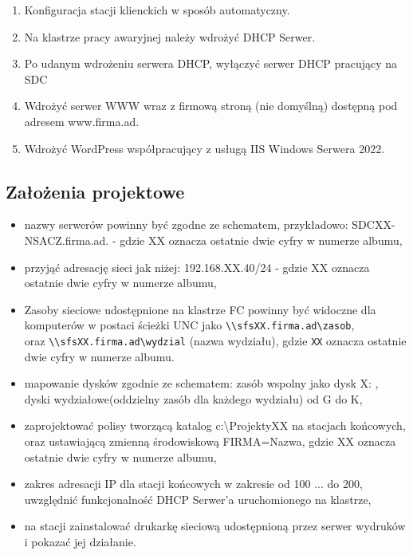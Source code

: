 \begin{enumerate}
          \newpage
    \item Konfiguracja stacji klienckich w sposób automatyczny.
    \item Na klastrze pracy awaryjnej należy wdrożyć DHCP Serwer.
    \item Po udanym wdrożeniu serwera DHCP, wyłączyć serwer DHCP pracujący na SDC
    \item Wdrożyć serwer WWW wraz z firmową stroną (nie domyślną) dostępną pod adresem
          www.firma.ad.
    \item Wdrożyć WordPress współpracujący z usługą IIS Windows Serwera 2022.
\end{enumerate}
\subsection{Założenia projektowe}
\begin{itemize}
    \item nazwy serwerów powinny być zgodne ze schematem, przykładowo: SDCXX-NSACZ.firma.ad. - gdzie
          XX oznacza ostatnie dwie cyfry w numerze albumu,
    \item przyjąć adresację sieci jak niżej: 192.168.XX.40/24 - gdzie XX oznacza ostatnie dwie cyfry w numerze albumu,
    \item Zasoby sieciowe udostępnione na klastrze FC powinny być widoczne dla komputerów w postaci ścieżki UNC jako \texttt{\textbackslash\textbackslash sfsXX.firma.ad\textbackslash zasob}, \\ oraz \texttt{\textbackslash\textbackslash sfsXX.firma.ad\textbackslash wydzial} (nazwa wydziału), gdzie \texttt{XX} oznacza ostatnie dwie cyfry w numerze albumu.
    \item mapowanie dysków zgodnie ze schematem:
          zasób wspolny jako dysk X: , dyski wydziałowe(oddzielny zasób dla każdego wydziału) od G do K,
    \item  zaprojektować polisy tworzącą katalog c:\textbackslash ProjektyXX na stacjach końcowych, oraz ustawiającą
          zmienną środowiskową FIRMA=Nazwa, gdzie XX oznacza ostatnie dwie cyfry w numerze albumu,
    \item zakres adresacji IP dla stacji końcowych w zakresie od 100 ... do 200, uwzględnić funkcjonalność DHCP Serwer’a uruchomionego na klastrze,
    \item na stacji zainstalować drukarkę sieciową udostępnioną przez serwer wydruków i pokazać jej
          działanie.
\end{itemize}
